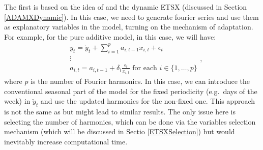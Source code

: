 \documentclass[
]{book}
\theoremstyle{definition}
\theoremstyle{definition}
\theoremstyle{definition}
\theoremstyle{definition}
\theoremstyle{remark}
\begin{document}
The first is based on the idea of \citet{DeLivera2010} and the dynamic ETSX (discussed in Section \ref{ADAMXDynamic}). In this case, we need to generate fourier series and use them as explanatory variables in the model, turning on the mechanism of adaptation. For example, for the pure additive model, in this case, we will have:
\begin{equation}
  \begin{aligned}
    & {y}_{t} = \check{y}_t + \sum_{i=1}^p a_{i,t-1} x_{i,t} + \epsilon_t \\
    & \vdots \\
    & a_{i,t} = a_{i,t-1} + \delta_i \frac{\epsilon_t}{x_{i,t}} \text{ for each } i \in \{1, \dots, p\}
  \end{aligned},
  \label{eq:ETSXADAMMultipleSeasonalityFourier}
\end{equation}
where \(p\) is the number of Fourier harmonics. In this case, we can introduce the conventional seasonal part of the model for the fixed periodicity (e.g.~days of the week) in \(\check{y}_t\) and use the updated harmonics for the non-fixed one. This approach is not the same as \citet{DeLivera2010} but might lead to similar results. The only issue here is selecting the number of harmonics, which can be done via the variables selection mechanism (which will be discussed in Sectio \ref{ETSXSelection}) but would inevitably increase computational time.
\end{document}
